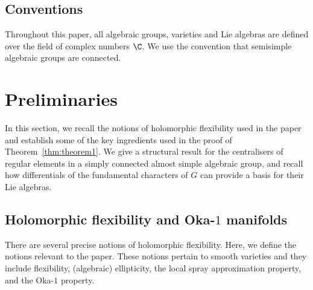 \documentclass[12pt, a4paper, oneside]{amsart}
\theoremstyle{plain} %
\theoremstyle{definition} %
\theoremstyle{remark} %
\begin{document}
\makeatletter
\begingroup
\let\@tocwrite\@gobbletwo
\subsection*{Conventions}
Throughout this paper, all algebraic groups, varieties and Lie algebras are defined over the field of complex numbers $\C$. We use the convention that semisimple algebraic groups are connected.
\par
\endgroup
\makeatother


\section{Preliminaries}\label{c:prelims}
In this section, we recall the notions of holomorphic flexibility used in the paper and establish some of the key ingredients used in the proof of Theorem~\ref{thm:theorem1}. We give a structural result for the centralisers of regular elements in a simply connected almost simple algebraic group, and recall how differentials of the fundamental characters of $G$ can provide a basis for their Lie algebras.

\subsection{Holomorphic flexibility and Oka-$1$ manifolds}\label{c:prelimsOka}
There are several precise notions of holomorphic flexibility. Here, we define the notions relevant to the paper. These notions pertain to smooth varieties and they include flexibility, (algebraic) ellipticity, the local spray approximation property, and the Oka-$1$ property. 
\end{document}
